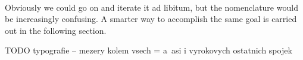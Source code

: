 \documentclass[12pt,a4paper]{article}
\newtheorem{theorem}{Theorem}[section]
\newenvironment{proof}
{\noindent \textit{Proof.}}
{\hspace*{\fill} $\Box$}
\newcommand{\set}[2]{\ensuremath{\{#1 \,|\, #2 \}}}
\newcommand{\el}{\prec}
\newcommand{\sub}{\subseteq}
\newcommand{\then}{\rightarrow}
\newcommand{\bce}{\begin{compactenum}}
\newcommand{\ece}{\end{compactenum}}
\begin{document}
\

Obviously we could go on and iterate it ad libitum, but the nomenclature would be increasingly confusing. A smarter way to accomplish the same goal is carried out in the following section.

TODO typografie -- mezery kolem vsech = a~asi i vyrokovych ostatnich spojek


{\color{red}
\begin{comment}


TODO tohle znamena, ze prvoradovou formuli nerozlisime $V$ od (prvniho) nedosazitelneho $\kappa$

\begin{theorem}\label{th:refl_inaccessible}[Lévy] The following are equivalent:
\bce[(i)]
\item $\kappa$ is inaccessible.
\item For every $R \sub V_\kappa$ and every first-order formula $\varphi(R)$, $\varphi(R)$ reflects in $V_\kappa$.
\item For every $R \sub V_\kappa$, the set $C = \set{\alpha<\kappa}{\langle V_\alpha,\in,R \cap V_\alpha\rangle \el \langle V_\kappa,\in,R \rangle}$ is closed unbounded.
\ece
\end{theorem}
\begin{proof}
Let's start with (i) $\then$ (iii) in a~way similar to \cite{KanamoriBook}.\newline
The set $\set{\alpha<\kappa}{\langle V_\alpha,\in,R \cap V_\alpha \rangle \el \langle V_\kappa,\in,R\rangle}$ is clearly closed, it remains to show that it is also unbounded.
To do so, let $\alpha<\kappa$ be arbitrary. Define $\alpha_n < \kappa$ for $n\in\omega$ by recursion as follows:\newline
Set $\alpha_0=\alpha$. Given $\alpha_n < \kappa$ define $\alpha_{n+1}$ to be the least $\beta \geq \alpha_n$ such as 
whenever $y_1,\ldots,y_k \in V_{\alpha_n}$ and
$\langle V_{\kappa}, \in, R \rangle \models \exists v_0 \varphi [v_0, y_1, \ldots, y_k ]$
for some formula $\varphi$, there is an $x \in V_{\beta}$ such that $\langle V_{\kappa}, \in, R\rangle \models \varphi [x, y_1, \ldots, y_k]$.
\newline
Since $\kappa$ is inaccessible, $|V_{\alpha_n}| < \kappa$ and so $\alpha_{n+1} < \kappa$.\newline
Finally, set $\alpha = sup({\alpha_n | n \in \omega})$. 

\end{comment}}
\end{document}
